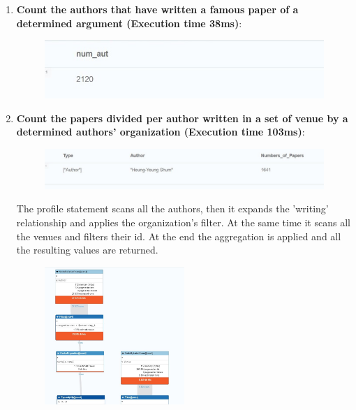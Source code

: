 \documentclass{Configuration_Files/PoliMi3i_thesis}
\begin{document}
\begin{enumerate}
\begin{figure}[H]
    \end{figure}
    \item \textbf{Count the authors that have written a famous paper of a determined argument (Execution time 38ms)}:
    \begin{figure}[H]
    \centering
    
    \end{figure}
    \begin{figure}[H]
    \centering
    \includegraphics[width=\textwidth]{Images/queries_neo4j/query_4.jpg}
    \end{figure}
    \item \textbf{Count the papers divided per author written in a set of venue by a determined authors' organization (Execution time 103ms)}:
    
    \begin{figure}[H]
    \centering
    \includegraphics[width=\textwidth]{Images/queries_neo4j/query_5.jpg}
    \end{figure}
  The profile statement scans all the authors, then it expands the 'writing' relationship and applies the organization's filter. At the same time it scans all the venues and filters their id. At the end the aggregation is applied and all the resulting values are returned.
    \begin{figure}[H]
    \centering
    \includegraphics[width=0.5\textwidth]{Images/queries_neo4j/query_5_p1.jpg}

\end{figure}
\end{enumerate}
\end{document}
